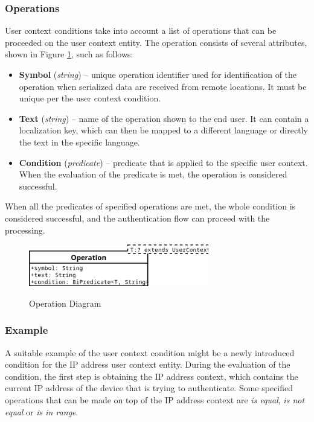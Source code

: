 \newpage

\subsubsection{Operations} \label{user-context-condition-operations}
User context conditions take into account a list of operations that can be proceeded on the user context entity.
The operation consists of several attributes, shown in Figure \ref{fig:operation-diagram}, such as follows:

\begin{itemize}
    \item \textbf{Symbol} (\textit{string}) -- unique operation identifier used for identification of the operation when serialized data are received from remote locations. It must be unique per the user context condition.
    \item \textbf{Text} (\textit{string}) -- name of the operation shown to the end user.
    It can contain a localization key, which can then be mapped to a different language or directly the text in the specific language. 
    \item \textbf{Condition} (\textit{predicate}) -- predicate that is applied to the specific user context. When the evaluation of the predicate is met, the operation is considered successful.
\end{itemize}

When all the predicates of specified operations are met, the whole condition is considered successful, and the authentication flow can proceed with the processing.

\begin{figure}[htbp]
  \centering
  \includegraphics[width=0.7\textwidth]{img/sections/5-design/operation-diagram.png}
  \label{fig:operation-diagram}
  \caption{Operation Diagram}
\end{figure}

\newpage

\subsubsection{Example}

A suitable example of the user context condition might be a newly introduced condition for the IP address user context entity.
During the evaluation of the condition, the first step is obtaining the IP address context, which contains the current IP address of the device that is trying to authenticate.
Some specified operations that can be made on top of the IP address context are \textit{is equal}, \textit{is not equal} or \textit{is in range}.

